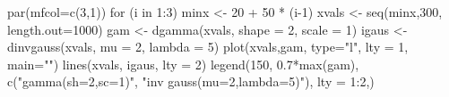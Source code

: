 \begin{Schunk}
\begin{Sinput}
 par(mfcol=c(3,1))
 for (i in 1:3){
      minx <- 20 + 50 * (i-1)
      xvals <- seq(minx,300, length.out=1000)
      gam <- dgamma(xvals, shape = 2, scale = 1)
      igaus <- dinvgauss(xvals, mu = 2, lambda = 5)
      plot(xvals,gam, type="l", lty = 1, main="")
      lines(xvals, igaus, lty = 2)
      legend(150, 0.7*max(gam), c("gamma(sh=2,sc=1)", "inv gauss(mu=2,lambda=5)"), lty = 1:2,)
  }
\end{Sinput}
\end{Schunk}
